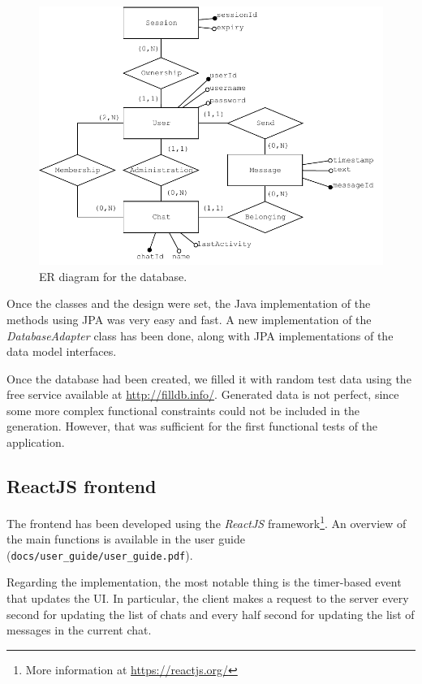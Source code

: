 \documentclass[10pt]{article}
\begin{document}
\begin{figure}[h!]
    \centering
    \includegraphics[width=\textwidth]{figs/ER}
    \caption{ER diagram for the database.}
    \label{fig:er}
\end{figure}

Once the classes and the design were set, the Java implementation of the methods using 
JPA was very easy and fast. A new implementation of the \emph{DatabaseAdapter}
class has been done, along with JPA implementations of the data model interfaces.

Once the database had been created, we filled it with random test data using the free
service available at \url{http://filldb.info/}. Generated data is not perfect, 
since some more complex functional constraints could not be included in the 
generation. However, that was sufficient for the first functional tests of the
application.

\subsection{ReactJS frontend}
The frontend has been developed using the \emph{ReactJS} framework\footnote{More
information at \url{https://reactjs.org/}}. An overview of the main functions 
is available in the user guide (\texttt{docs/user\_guide/user\_guide.pdf}).

Regarding the implementation, the most notable thing is the timer-based event
that updates the UI. In particular, the client makes a request to the server
every second for updating the list of chats and every half second for updating 
the list of messages in the current chat.
\end{document}
